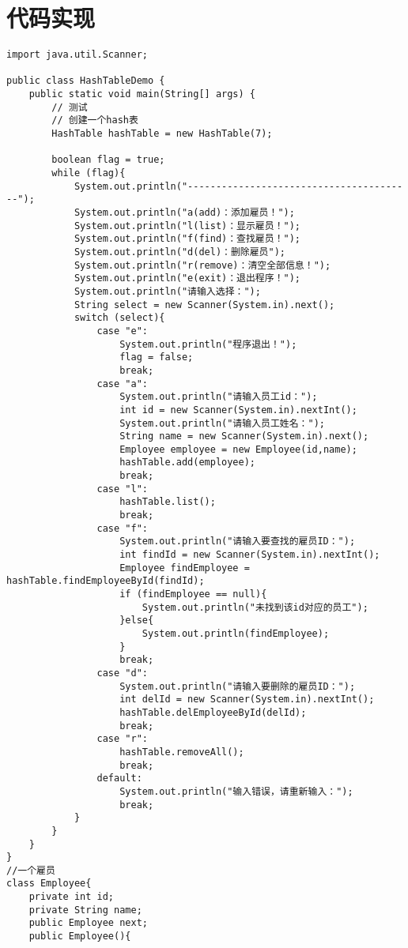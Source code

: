 \documentclass[a4paper]{report}
\begin{document}
\section{代码实现}
\begin{lstlisting}
import java.util.Scanner;

public class HashTableDemo {
    public static void main(String[] args) {
        // 测试
        // 创建一个hash表
        HashTable hashTable = new HashTable(7);

        boolean flag = true;
        while (flag){
            System.out.println("----------------------------------------");
            System.out.println("a(add)：添加雇员！");
            System.out.println("l(list)：显示雇员！");
            System.out.println("f(find)：查找雇员！");
            System.out.println("d(del)：删除雇员");
            System.out.println("r(remove)：清空全部信息！");
            System.out.println("e(exit)：退出程序！");
            System.out.println("请输入选择：");
            String select = new Scanner(System.in).next();
            switch (select){
                case "e":
                    System.out.println("程序退出！");
                    flag = false;
                    break;
                case "a":
                    System.out.println("请输入员工id：");
                    int id = new Scanner(System.in).nextInt();
                    System.out.println("请输入员工姓名：");
                    String name = new Scanner(System.in).next();
                    Employee employee = new Employee(id,name);
                    hashTable.add(employee);
                    break;
                case "l":
                    hashTable.list();
                    break;
                case "f":
                    System.out.println("请输入要查找的雇员ID：");
                    int findId = new Scanner(System.in).nextInt();
                    Employee findEmployee = hashTable.findEmployeeById(findId);
                    if (findEmployee == null){
                        System.out.println("未找到该id对应的员工");
                    }else{
                        System.out.println(findEmployee);
                    }
                    break;
                case "d":
                    System.out.println("请输入要删除的雇员ID：");
                    int delId = new Scanner(System.in).nextInt();
                    hashTable.delEmployeeById(delId);
                    break;
                case "r":
                    hashTable.removeAll();
                    break;
                default:
                    System.out.println("输入错误，请重新输入：");
                    break;
            }
        }
    }
}
//一个雇员
class Employee{
    private int id;
    private String name;
    public Employee next;
    public Employee(){


\end{lstlisting}
\end{document}
